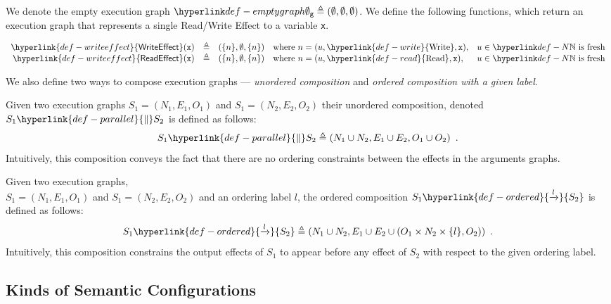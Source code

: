 \documentclass{book}
\newcommand\Read[0]{\hyperlink{def-read}{\text{Read}}}
\newcommand\Write[0]{\hyperlink{def-write}{\text{Write}}}
\newcommand\WriteEffect[0]{\hyperlink{def-writeeffect}{\textsf{WriteEffect}}}
\newcommand\ReadEffect[0]{\hyperlink{def-writeeffect}{\textsf{ReadEffect}}}
\newcommand\ordered[3]{{#1}\hyperlink{def-ordered}{\xrightarrow{#2}}{#3}}
\newcommand\parallelcomp[0]{\hyperlink{def-parallel}{\parallel}}
\begin{document}
We denote the empty execution graph $\emptygraph \triangleq (\emptyset, \emptyset, \emptyset)$.
%
We define the following functions, which return an execution graph that represents a single Read/Write Effect to a variable \texttt{x}.
\hypertarget{def-writeeffect}{}
\hypertarget{def-readeffect}{}
\begin{definition}
\[
  \begin{array}{rclll}
    \WriteEffect(\vx) &\triangleq& (\{n\}, \emptyset, \{n\}) & \text{where } n=(u, \Write, \vx), & u\in\N \text{ is fresh}\\
    \ReadEffect(\vx)  &\triangleq& (\{n\}, \emptyset, \{n\}) & \text{where } n=(u, \Read, \vx),   & u\in\N \text{ is fresh}\\
  \end{array}
\]
\end{definition}

We also define two ways to compose execution graphs --- \emph{unordered composition} and
\emph{ordered composition with a given label}.

\hypertarget{def-parallel}{}
\begin{definition}
Given two execution graphs $S_1 = (N_1, E_1, O_1)$ and $S_1 = (N_2, E_2, O_2)$ their unordered composition,
denoted $S_1 \parallelcomp S_2$ is defined as follows:
\[
  S_1 \parallelcomp S_2\triangleq (N_1 \cup N_2, E_1 \cup E_2, O_1 \cup O_2) \enspace.
\]
Intuitively, this composition conveys the fact that there are no ordering constraints between the effects
in the arguments graphs.
\end{definition}

\hypertarget{def-ordered}{}
\begin{definition}
Given two execution graphs, \\ $S_1 = (N_1, E_1, O_1)$ and $S_1 = (N_2, E_2, O_2)$ and an ordering label $l$,
the ordered composition $\ordered{S_1}{l}{S_2}$ is defined as follows:
\[
  \ordered{S_1}{l}{S_2} \triangleq (N_1 \cup N_2, E_1 \cup E_2 \cup (O_1 \times N_2 \times \{l\}, O_2)) \enspace.
\]
Intuitively, this composition constrains the output effects of $S_1$ to appear before any effect of $S_2$ with respect
to the given ordering label.
\end{definition}

\subsection{Kinds of Semantic Configurations \label{sec:KindsOfSemanticConfigurations}}
\end{document}
